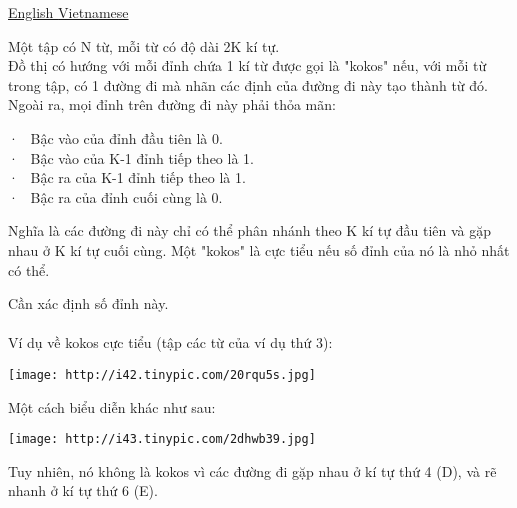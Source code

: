 \href{/problems/show/MKOKOS/en/}{       English      }\href{/problems/show/MKOKOS/vn/}{       Vietnamese      }



   Một tập có N từ, mỗi từ có độ dài 2K kí tự.   
\\   Đồ thị có hướng với mỗi đỉnh chứa 1 kí từ được gọi là "kokos" nếu, với mỗi từ trong tập, có 1 đường đi mà nhãn các định của đường đi này tạo thành từ đó. Ngoài ra, mọi đỉnh trên đường đi này phải thỏa mãn:  

   ·  Bậc vào của đỉnh đầu tiên là 0.   
\\   ·  Bậc vào của K-1 đỉnh tiếp theo là 1.   
\\   ·  Bậc ra của K-1 đỉnh tiếp theo là 1.   
\\   ·  Bậc ra của đỉnh cuối cùng là 0.  

   Nghĩa là các đường đi này chỉ có thể phân nhánh theo K kí tự đầu tiên và gặp nhau ở K kí tự cuối cùng. Một "kokos" là cực tiểu nếu số đỉnh của nó là nhỏ nhất có thể.  

   Cần xác định số đỉnh này.   
\\
\\   Ví dụ về kokos cực tiểu (tập các từ của ví dụ thứ 3):  


\texttt{[image: http://i42.tinypic.com/20rqu5s.jpg]}

   Một cách biểu diễn khác như sau:  


\texttt{[image: http://i43.tinypic.com/2dhwb39.jpg]}

   Tuy nhiên, nó không là kokos vì các đường đi gặp nhau ở kí tự thứ 4 (D), và rẽ nhanh ở kí tự thứ 6 (E).  

\